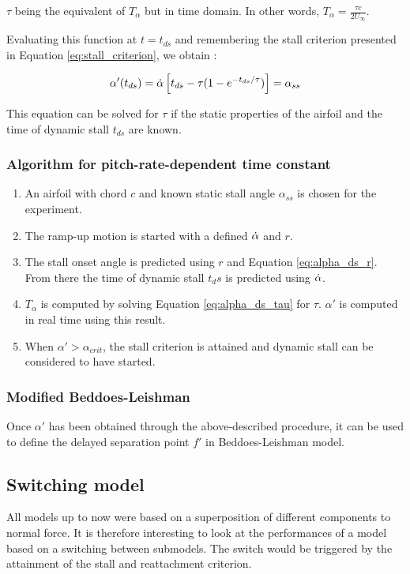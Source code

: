 \noindent $\tau$ being the equivalent of $T_\alpha$ but in time domain. In other words, $T_\alpha = \frac{\tau c}{2U_\infty}$.

Evaluating this function at $t=t_{ds}$ and remembering the stall criterion presented in Equation \eqref{eq:stall_criterion}, we obtain : 

\begin{equation}
\alpha'(t_{ds}) = \dot{\alpha}\left[t_{ds} - \tau(1-e^{-t_{ds} / \tau})\right] = \alpha_{ss}
\label{eq:alpha_ds_tau}
\end{equation}

This equation can be solved for $\tau$ if the static properties of the airfoil and the time of dynamic stall $t_{ds}$ are known.

\subsubsection{Algorithm for pitch-rate-dependent time constant}

\begin{enumerate}
\item An airfoil with chord $c$ and known static stall angle $\alpha_{ss}$ is chosen for the experiment. 
\item The ramp-up motion is started with a defined $\dot{\alpha}$ and $r$.
\item The stall onset angle is predicted using $r$ and Equation \eqref{eq:alpha_ds_r}. From there the time of dynamic stall $t_ds$ is predicted using $\dot{\alpha}$.
\item $T_\alpha$ is computed by solving Equation  \eqref{eq:alpha_ds_tau} for $\tau$. $\alpha'$ is computed in real time using this result. 
\item When $\alpha' > \alpha_{crit}$, the stall criterion is attained and dynamic stall can be considered to have started. 
\end{enumerate}

\subsubsection{Modified Beddoes-Leishman}

Once $\alpha'$ has been obtained through the above-described procedure, it can be used to define the delayed separation point $f'$ in Beddoes-Leishman model.   

\subsection{Switching model}

All models up to now were based on a superposition of different components to normal force. It is therefore interesting to look at the performances of a model based on a switching between submodels. The switch would be triggered by the attainment of the stall and reattachment criterion.